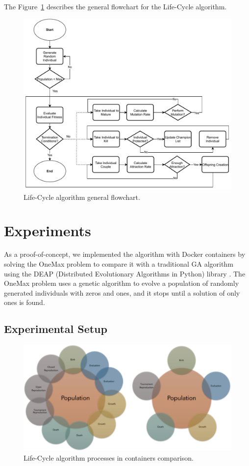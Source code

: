 \documentclass[runningheads]{llncs}
\begin{document}
The Figure~\ref{fig4} describes the general flowchart for the Life-Cycle algorithm.

\begin{figure}
    \includegraphics[width=\textwidth]{img/fig4_flowchart.pdf}
    \caption{Life-Cycle algorithm general flowchart.} \label{fig4}
    \end{figure}


\section{Experiments} 

As a proof-of-concept, we implemented the algorithm with Docker containers by
solving the OneMax problem to compare it with a traditional GA algorithm using
the DEAP (Distributed Evolutionary Algorithms in Python) library
\cite{fortin2012deap}. The OneMax problem \cite{krejca2020lower,witt2019upper}
uses a genetic algorithm to evolve a population of randomly generated
individuals with zeros and ones, and it stops until a solution of only ones is
found.

\subsection{Experimental Setup}

\begin{figure}
    \includegraphics[width=\textwidth]{img/fig5_processes_containers.pdf}
    \caption{Life-Cycle algorithm processes in containers comparison.} \label{fig5}
    \end{figure}
\end{document}
